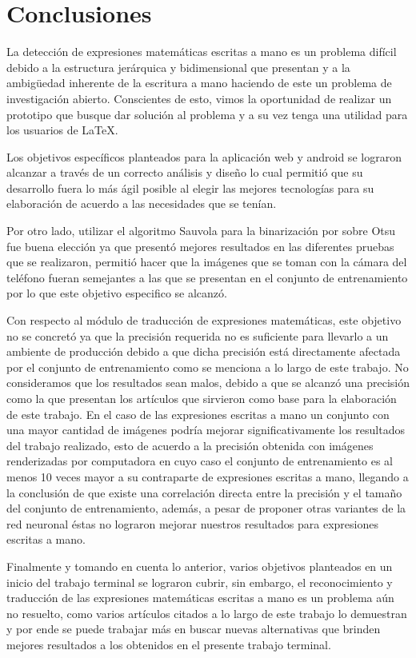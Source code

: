 \chapter{Conclusiones}
La detección de expresiones matemáticas escritas a mano es un problema difícil debido a la estructura jerárquica y bidimensional que presentan y a la ambigüedad inherente de la escritura a mano haciendo de este un problema de investigación abierto. Conscientes de esto, vimos la oportunidad de realizar un prototipo que busque dar solución al problema y a su vez tenga una utilidad para los usuarios de \LaTeX.

Los objetivos específicos planteados para la aplicación web y android se lograron alcanzar a través de un correcto análisis y diseño lo cual permitió que su desarrollo fuera lo más ágil posible al elegir las mejores tecnologías para su elaboración de acuerdo a las necesidades que se tenían.

Por otro lado, utilizar el algoritmo Sauvola para la binarización por sobre Otsu fue buena elección ya que presentó mejores resultados en las diferentes pruebas que se realizaron, permitió hacer que la imágenes que se toman con la cámara del teléfono fueran semejantes a las que se presentan en el conjunto de entrenamiento por lo que este objetivo especifico se alcanzó.

Con respecto al módulo de traducción de expresiones matemáticas, este objetivo no se concretó ya que la precisión requerida no es suficiente para llevarlo a un ambiente de producción debido a que dicha precisión está directamente afectada por el conjunto de entrenamiento como se menciona a lo largo de este trabajo. No consideramos que los resultados sean malos, debido a que se alcanzó una precisión como la que presentan los artículos que sirvieron como base para la elaboración de este trabajo. En el caso de las expresiones escritas a mano un conjunto con una mayor cantidad de imágenes podría mejorar significativamente los resultados del trabajo realizado, esto de acuerdo a la precisión obtenida con imágenes renderizadas por computadora en cuyo caso el conjunto de entrenamiento es al menos 10 veces mayor a su contraparte de expresiones escritas a mano, llegando a la conclusión de que existe una correlación directa entre la precisión y el tamaño del conjunto de entrenamiento, además, a pesar de proponer otras variantes de la red neuronal éstas no lograron mejorar nuestros resultados para expresiones escritas a mano.

Finalmente y tomando en cuenta lo anterior, varios objetivos planteados en un inicio del trabajo terminal se lograron cubrir, sin embargo, el reconocimiento y traducción de las expresiones matemáticas escritas a mano es un problema aún no resuelto, como varios artículos citados a lo largo de este trabajo lo demuestran y por ende se puede trabajar más en buscar nuevas alternativas que brinden mejores resultados a los obtenidos en el presente trabajo terminal.

